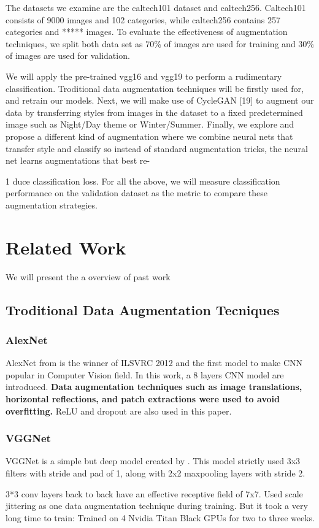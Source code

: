 \documentclass[a4paper,11pt]{article}
\begin{document}
The datasets we examine are the caltech101 dataset and caltech256. Caltech101 consists of 9000 images and 102 categories, while caltech256 contains 257 categories and ***** images. To evaluate the effectiveness of augmentation techniques, we split both data set as 70\% of images are used for training and 30\% of images are used for validation.

We will apply the pre-trained vgg16 and vgg19 to perform a rudimentary classification. Troditional data augmentation techniques will be firstly used for, and retrain our models. Next, we will make use of CycleGAN [19] to augment our data by transferring styles from images in the dataset to a ﬁxed predetermined image such as Night/Day theme or Winter/Summer. Finally, we explore and propose a different kind of augmentation where we combine neural nets that transfer style and classify so instead of standard augmentation tricks, the neural net learns augmentations that best re-

1 duce classiﬁcation loss. For all the above, we will measure classiﬁcation performance on the validation dataset as the metric to compare these augmentation strategies.

\section{Related Work}
We will present the a overview of past work
\subsection{Troditional Data Augmentation Tecniques}
\subsubsection{AlexNet}
AlexNet from \cite{krizhevsky2012imagenet} is the winner of ILSVRC 2012 and the first model to make CNN popular in Computer Vision field. In this work, a 8 layers CNN model are introduced. \textbf{Data augmentation techniques such as image translations, horizontal reflections, and patch extractions were used to avoid overfitting.} ReLU and dropout are also used in this paper.
\subsubsection{VGGNet}
VGGNet is a simple but deep model created by \cite{simonyan2014very}. This model strictly used 3x3 filters with stride and pad of 1, along with 2x2 maxpooling layers with stride 2.
\begin{outline}
 3*3 conv layers back to back have an effective receptive field of 7x7.
\1 Used scale jittering as one data augmentation technique during training.
\1 But it took a very long time to train: Trained on 4 Nvidia Titan Black GPUs for two to three weeks.
\end{outline}
\end{document}
